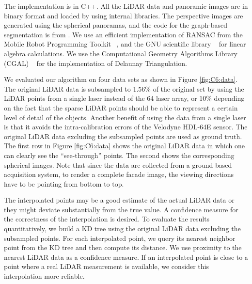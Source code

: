The implementation is in C++. All the LiDAR data and panoramic images are in binary format and loaded by using internal libraries. The perspective images are generated using the spherical panoramas, and the code for the graph-based segmentation is from \cite{Felzenszwalb04}. We use an efficient implementation of RANSAC from the Mobile Robot Programming Toolkit ~\cite{mrpt-url}, and the GNU scientific library ~\cite{gnu-url} for linear algebra calculations. We use the Computational Geometry Algorithms Library (CGAL) ~\cite{cgal-url} for the implementation of Delaunay Triangulation.  

We evaluated our algorithm on four data sets as shown in Figure \ref{fig:C6:data}. The original LiDAR data is subsampled to 1.56\% of the original set by using the LiDAR points from a single laser instead of the 64 laser array, or 10\% depending on the fact that the sparse LiDAR points should be able to represent a certain level of detail of the objects. Another benefit of using the data from a single laser is that it avoids the intra-calibration errors of the Velodyne HDL-64E sensor. The original LiDAR data excluding the subsampled points are used as ground truth. The first row in Figure \ref{fig:C6:data} shows the original LiDAR data in which one can clearly see the “see-through” points. The second shows the corresponding spherical images. Note that since the data are collected from a ground based acquisition system, to render a complete facade image, the viewing directions have to be pointing from bottom to top.  

The interpolated points may be a good estimate of the actual LiDAR data or they might deviate substantially from the true value. A confidence measure for the correctness of the interpolation is desired. To evaluate the results quantitatively, we build a KD tree using the original LiDAR data excluding the subsampled points. For each interpolated point, we query its nearest neighbor point from the KD tree and then compute its distance. We use proximity to the nearest LiDAR data as a confidence measure. If an interpolated point is close to a point where a real LiDAR measurement is available, we consider this interpolation more reliable.  

